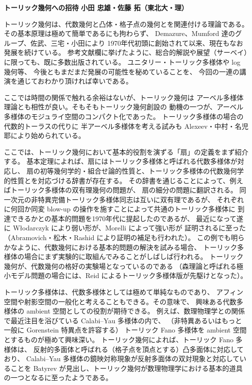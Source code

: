 \documentclass[uplatex,dvipdfmx]{jlreq}
\begin{document}
\noindent
{\large\bfseries トーリック幾何への招待}
\hfill
{\large\bfseries 小田 忠雄・佐藤 拓（東北大・理）}

\bigskip

トーリック幾何は、代数幾何と凸体・格子点の幾何とを関連付ける理論である。
その基本原理は極めて簡単であるにも拘わらず、
Demazure、Mumford 達のグループ、佐武、三宅・小田により
1970年代初頭に創始されて以来、現在もなお発展を続けている。
参考文献欄に挙げたように、総合的解説や展望（サーベイ）に限っても、既に多数出版されている。
ユニタリー・トーリック多様体や log 幾何等、
今後ともまだまだ発展の可能性を秘めていることを、
今回の一連の講演を通じておわかり頂ければ幸いである。

ここでは時間の関係で触れる余裕はないが、トーリック幾何は
アーベル多様体理論とも相性が良い。そもそもトーリック幾何創設の
動機の一つが、アーベル多様体のモジュライ空間のコンパクト化であった。
トーリック多様体の場合の代数的トーラスの代りに
半アーベル多様体を考える試みも Alexeev・中村・名児耶により始められている。

ここでは、トーリック幾何において基本的役割を演ずる「扇」の定義をまず紹介する。
基本定理によれば、扇にはトーリック多様体と呼ばれる代数多様体が対応し、
扇の初等幾何学的・組合せ論的性質と、トーリック多様体の代数幾何学的性質とを対応づける辞書が存在する。
その辞書を通じることによって、例えばトーリック多様体の双有理幾何の問題が、
扇の細分の問題に翻訳される。
同一次元の非特異完備トーリック多様体同志は互いに双有理であるが、
それぞれに何回か同変 blow-up の操作を施すことによって共通のトーリック多様体に
到達できるかとの基本的問題を1970年代に提起したのであるが、
最近になって遂に W{\l}odarczyk により弱い形が、Morelli によって強い形が
証明されるに至った（Abramovich・松木・Rashid により証明の補足も行われた）。
この例でも明らかなように、代数幾何における基本的問題の解決を試みる場合、
トーリック多様体の場合にまず実験的に取組んでみることがしばしば行われる。
トーリック幾何が、代数幾何の格好の実験場となっているのである
（森理論と呼ばれる極小モデル問題の場合には、Reid によるトーリック多様体版が先駆けとなった）。

トーリック多様体は、代数多様体としては極めて単純なものであり、
アフィン空間や射影空間の一般化と考えることもできる。その意味で、
興味ある代数多様体の ambient 空間としての役割が期待できる。
例えば、数理物理学との関係で最近注目を浴びている Calabi--Yau 多様体の内で、
（非特異あるいはもっと一般に Gorenstein 特異点を許容する）
トーリック Fano 多様体を ambient 空間とするものが極めて興味深い。
トーリック幾何によれば、トーリック Fano 多様体は、
反射的多面体と呼ばれる（格子点を頂点とする）凸多面体に対応しており、
Calabi--Yau 多様体の鏡映対称現象が反射多面体の双対現象と対応していることを
Batyrev が見出し、トーリック幾何が数理物理学における基本的道具の一つとなるに至ったようである。
\end{document}
